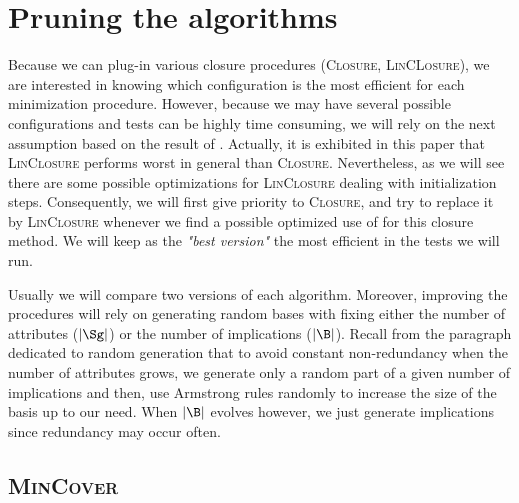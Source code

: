 \section{Pruning the algorithms}

Because we can plug-in various closure procedures (\textsc{Closure}, \textsc{LinCLosure}), we are interested in knowing which configuration is
the most efficient for each minimization procedure. However, because we may
have several possible configurations and tests can be highly time consuming,
we will rely on the next assumption based on the result of \cite{bazhanov_optimizations_2014}. Actually, it is exhibited in this paper
that \textsc{LinClosure} performs worst in general than \textsc{Closure}. Nevertheless, as we will see there are some possible optimizations for \textsc{LinClosure} dealing with initialization steps. Consequently, 
we will first give priority to \textsc{Closure}, and try to replace it 
by \textsc{LinClosure} whenever we find a possible optimized use of 
for this closure method. We will keep as the \textit{"best version"} the most efficient in the tests we will run. 

\vspace{1.2em}

Usually we will compare two versions of each algorithm. Moreover, improving
the procedures will rely on generating random bases with fixing either the
number of attributes ($|\Sg|$) or the number of implications ($|\B|$). Recall from the paragraph dedicated to random generation that to avoid constant non-redundancy when the number of attributes grows, we generate only a random part of a given number of implications and then, use Armstrong rules randomly to increase the size of the basis up to our need. When $|\B|$ evolves however,
we just generate implications since redundancy may occur often.

\subsection{\textsc{MinCover}}

